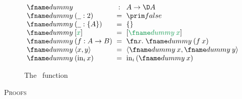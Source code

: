 \documentclass{rntz}\usepackage{fantasy}%
\begin{document}




\begin{figure*}
  \[\setlength\arraycolsep{.3em}\begin{array}{lcl}
    \dummy &:& A \to \D A\\
    \dummy \<(\pwild : \tbool) &=& \efalse\\
    \dummy \<(\pwild : \tset{A}) &=& \eset{}\\
    \dummy \<\eboxd{x} &=& \eboxd{\dummy\<x}\\
    \dummy \<(f : A \to B) &=& \fnof{x} \dummy\<(f\<x)\\
    \dummy \<\etuple{x,y} &=& \etuple{\dummy\<x, \dummy\<y}\\
    \dummy \<(\inj i x) &=& \inj i (\dummy\<x)
  \end{array}\]
  \caption{The \dummy\ function}
  \label{fig:dummy}
\end{figure*}


\clearpage
\appendix
\begin{center}\Large\scshape Proofs\end{center}
\end{document}
